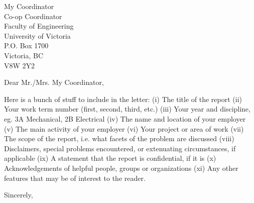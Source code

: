 \documentclass[10pt]{letter}
\begin{document}
\begin{letter}{
	My Coordinator \\
	Co-op Coordinator \\
	Faculty of Engineering \\
	University of Victoria \\
	P.O. Box 1700 \\
	Victoria, BC \\
	V8W 2Y2
}

\opening{Dear Mr./Mrs. My Coordinator,}

Here is a bunch of stuff to include in the letter: (i) The title of the report (ii) Your work term
number (first, second, third, etc.) (iii) Your year and discipline, eg. 3A Mechanical, 2B Electrical
(iv) The name and location of your employer (v) The main activity of your employer (vi) Your
project or area of work (vii) The scope of the report, i.e. what facets of the problem are discussed
(viii) Disclaimers, special problems encountered, or extenuating circumstances, if applicable (ix) A
statement that the report is confidential, if it is (x) Acknowledgements of helpful people, groups or
organizations (xi) Any other features that may be of interest to the reader.

\closing{Sincerely,}


\end{letter}
\end{document}
